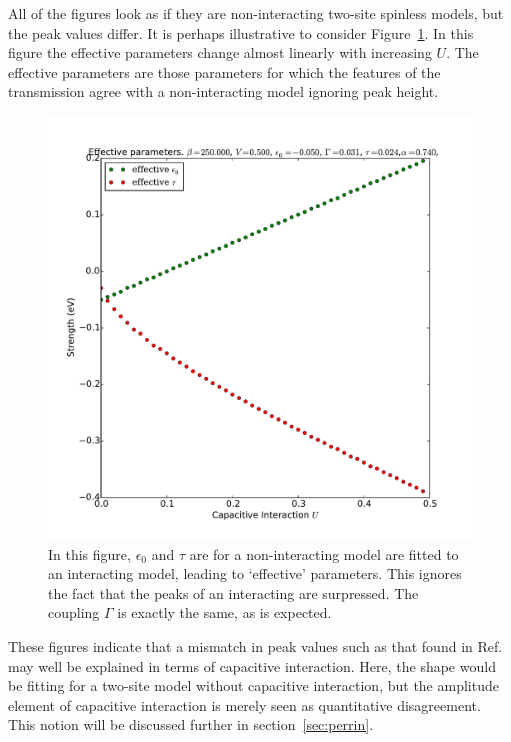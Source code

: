 All of the figures look as if they are non-interacting two-site spinless models, but the peak values differ. It is perhaps illustrative to consider Figure~\ref{fig:perrin_effective}. In this figure the effective parameters change almost linearly with increasing $U$. The effective parameters are those parameters for which the features of the transmission agree with a non-interacting model ignoring peak height.
\begin{figure}[h]
    \centering
    \includegraphics[height=.35\textheight]{pdf/trans/perrin_effective.pdf}
    \caption{In this figure, $\epsilon_0$ and $\tau$ are for a non-interacting model are fitted to an interacting model, leading to `effective' parameters. This ignores the fact that the peaks of an interacting are surpressed. The coupling $\Gamma$ is exactly the same, as is expected.}
    \label{fig:perrin_effective}
\end{figure}


These figures indicate that a mismatch in peak values such as that found in Ref.~\cite{perrinnano} may well be explained in terms of capacitive interaction. Here, the shape would be fitting for a two-site model without capacitive interaction, but the amplitude element of capacitive interaction is merely seen as quantitative disagreement. This notion will be discussed further in section~\ref{sec:perrin}. 

